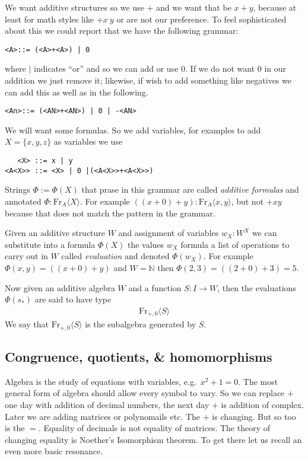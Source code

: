 We want additive structures so we use $+$ and we want that be $x+y$, because 
at least for math 
styles like $+x~y$ or  are not our preference.
To feel sophisticated about this we could report that we have the following 
grammar:
\begin{center}
\begin{lstlisting}
<A>::= (<A>+<A>) | 0
\end{lstlisting}   
\end{center}
where $|$ indicates ``or'' and so we can add or use $0$.  If we do not want 
$0$ in our addition we just remove it; likewise, if wish to add something like 
negatives we can add this as well as in the following.
\begin{center}
\begin{lstlisting}
<An>::= (<AN>+<AN>) | 0 | -<AN>
\end{lstlisting}   
\end{center}


We will want some formulas.  So we add variables, 
for examples to add $X=\{x,y,z\}$ as variables we use
\begin{center}
\begin{lstlisting}
   <X> ::= x | y 
<A<X>> ::= <X> | 0 |(<A<X>>+<A<X>>)      
\end{lstlisting}
\end{center}


Strings $\Phi:=\Phi(X)$ that prase in this grammar are called \emph{additive formulas} 
and annotated $\Phi:\text{Fr}_{A}\langle X\rangle$.  For example 
$((x+0)+y):\text{Fr}_A\langle x,y\rangle$, 
but not $+xy$ because that does not match the pattern in the grammar.

Given an additive structure $W$ and assignment of variables $w_X:W^X$
we can substitute into a formula $\Phi(X)$ the values $w_X$ formula 
a list of operations to carry out in $W$ called \emph{evaluation} and denoted 
$\Phi(w_X)$.  For example $\Phi(x,y)=((x+0)+y)$ and $W=\mathbb{N}$ then 
$\Phi(2,3)=((2+0)+3)=5$.  

Now given an additive algebra $W$ and a function $S:I\to W$, then 
the evaluations $\Phi(s_*)$ are said to have type 
\begin{align*}
    \text{Fr}_{+,0}\langle S\rangle 
\end{align*}
We say that $\text{Fr}_{+,0}\langle S\rangle$ is the subalgebra generated 
by $S$.

\subsection{Congruence, quotients, \& homomorphisms}
Algebra is the study of equations with variables, e.g.\ $x^2+1=0$.  
The most general form of algebra should allow every symbol to vary.  
So we can replace $+$ one day with addition of decimal numbers, 
the next day $+$ is addition of complex.  Later we are adding matrices
or polynomails etc.  The $+$ is changing.  But so too is the $=$. 
Equality of decimals is not equality of matrices.  The theory of 
changing equality is Noether's Isomorphism theorem.  To get there let 
us recall an even more basic resonance.

